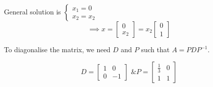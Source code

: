 \documentclass[12pt, a4paper]{article}
\begin{document}
\begin{center}
    \newpage
    General solution is $\begin{cases}
        x_1 = 0 \\
        x_2 = x_2
    \end{cases}$
    \[
        \implies x = \begin{bmatrix}
            0 \\
            x_2
        \end{bmatrix} = x_2 \begin{bmatrix}
            0 \\
            1
        \end{bmatrix}
    \]
\end{center}

To diagonalise the matrix, we need $D$ and $P$ such that $A = PDP^{-1}$.

\[
    D = \begin{bmatrix}
        1 & 0 \\
        0 & -1
    \end{bmatrix} \text{  \&  } P = \begin{bmatrix}
        \frac{1}{3} & 0 \\
        1 & 1
    \end{bmatrix}
\]
\end{document}
